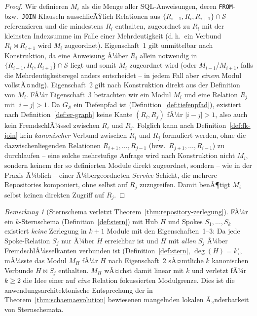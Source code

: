 ﻿\documentclass[a4paper,12pt]{report}
\theoremstyle{definition}
\theoremstyle{remark}
\newtheorem{remark}{Bemerkung}[chapter]
\begin{document}
\begin{proof}
Wir definieren $M_i$ als die Menge aller SQL-Anweisungen, deren
\texttt{FROM}- bzw.\ \texttt{JOIN}-Klauseln ausschlieÃŸlich Relationen
aus $\{R_{i-1},R_i,R_{i+1}\}\cap\mathcal{S}$ referenzieren und die
mindestens $R_i$ enthalten, zugeordnet zu $R_i$ mit der kleinsten
Indexsumme im Falle einer Mehrdeutigkeit (d.\,h.\ ein Verbund
$R_i\Join R_{i+1}$ wird $M_i$ zugeordnet). Eigenschaft~1 gilt
unmittelbar nach Konstruktion, da eine Anweisung Ã¼ber $R_i$ allein
notwendig in $\{R_{i-1},R_i,R_{i+1}\}\cap\mathcal{S}$ liegt und somit
$M_i$ zugeordnet wird (oder $M_{i-1}$/$M_{i+1}$, falls die
Mehrdeutigkeitsregel anders entscheidet -- in jedem Fall aber
\emph{einem} Modul vollstÃ¤ndig). Eigenschaft~2 gilt nach Konstruktion
direkt aus der Definition von $M_i$. FÃ¼r Eigenschaft~3 betrachten wir
ein Modul $M_i$ und eine Relation $R_j$ mit $|i-j|>1$. Da
$G_{\mathcal{S}}$ ein Tiefenpfad ist (Definition~\ref{def:tiefenpfad}),
existiert nach Definition~\ref{def:er-graph} keine Kante
$(R_i,R_j)$ fÃ¼r $|i-j|>1$, also auch kein FremdschlÃ¼ssel zwischen
$R_i$ und $R_j$. Folglich kann nach
Definition~\ref{def:fk-join} kein \emph{kanonischer} Verbund zwischen
$R_i$ und $R_j$ formuliert werden, ohne die dazwischenliegenden
Relationen $R_{i+1},\ldots,R_{j-1}$ (bzw.\ $R_{j+1},\ldots,R_{i-1}$) zu
durchlaufen -- eine solche mehrstufige Anfrage wird nach Konstruktion
nicht $M_i$, sondern keinem der so definierten Module direkt
zugeordnet, sondern -- wie in der Praxis Ã¼blich -- einer
Ã¼bergeordneten \emph{Service}-Schicht, die mehrere Repositories
komponiert, ohne selbst auf $R_j$ zuzugreifen. Damit benÃ¶tigt $M_i$
selbst keinen direkten Zugriff auf $R_j$. \qedhere
\end{proof}

\begin{remark}[Sternschema verletzt Theorem~\ref{thm:repository-zerlegung}]
FÃ¼r ein $k$-Sternschema (Definition~\ref{def:stern}) mit Hub $H$ und
Spokes $S_1,\ldots,S_k$ existiert \emph{keine} Zerlegung in $k+1$
Module mit den Eigenschaften~1--3: Da jede Spoke-Relation $S_j$ nur
Ã¼ber $H$ erreichbar ist und $H$ mit \emph{allen} $S_j$ Ã¼ber
FremdschlÃ¼sselkanten verbunden ist (Definition~\ref{def:stern}, $\deg(H)=k$),
mÃ¼sste das Modul $M_H$ fÃ¼r $H$ nach Eigenschaft~2 sÃ¤mtliche
$k$ kanonischen Verbunde $H\Join S_j$ enthalten. $M_H$ wÃ¤chst damit
linear mit $k$ und verletzt fÃ¼r $k\geq 2$ die Idee einer auf
\emph{eine} Relation fokussierten Modulgrenze. Dies ist die
anwendungsarchitektonische Entsprechung der in
Theorem~\ref{thm:schaemaevolution} bewiesenen mangelnden lokalen
Ã„nderbarkeit von Sternschemata.
\end{remark}
\end{document}
